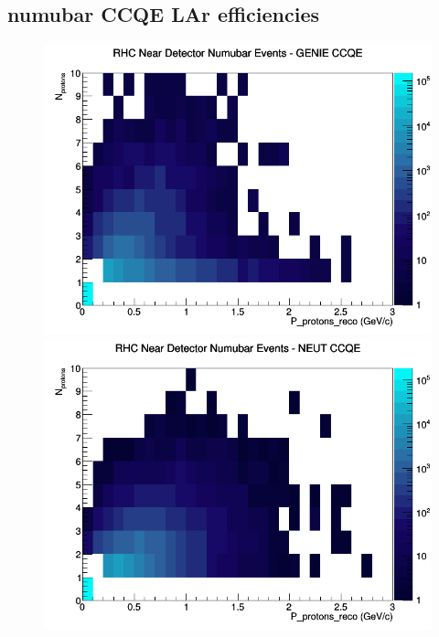 \documentclass[12pt]{article}
\begin{document}
\subsection{numubar CCQE LAr efficiencies}
\begin{figure}[h]
\includegraphics[width=\linewidth]{eff_N_P/LAr/protons/CCQE_RHC_ND_numubar_N_P_GENIE.png}
\endminipage
{}
\includegraphics[width=\linewidth]{eff_N_P/LAr/protons/CCQE_RHC_ND_numubar_N_P_NEUT.png}
\endminipage
{}

\end{figure}
\end{document}

